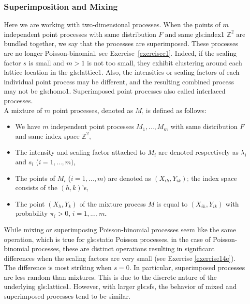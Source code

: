 \documentclass[10pt]{article}
\begin{document}
\subsubsection{Superimposition and Mixing}\label{sm1}

Here we are working with two-dimensional processes. When the points of $m$ independent point processes with same distribution $F$
and same \gls{gls:index1} $\mathbb{Z}^2$ are bundled together, we say that the processes are \textcolor{index}{superimposed}. These processes are no longer Poisson-binomial, see
Exercise~\ref{exercisec1}. Indeed, if the scaling factor $s$ is small and $m>1$ is not too small, they exhibit clustering around each lattice location in the \gls{gls:lattice1}. Also, the intensities or scaling factors of each individual point process may be different, and the resulting combined process may not be \gls{gls:homo1}.
Superimposed point processes also called \textcolor{index}{interlaced} processes. \vspace{1ex} \\
A \textcolor{index}{mixture} of $m$ point processes, denoted as $M$, is defined as follows:
\begin{itemize}
\item We have $m$ independent point processes $M_1,\dots,M_m$ with same distribution $F$ and same index space $\mathbb{Z}^2$,
\item The intensity and scaling factor attached to $M_i$ are denoted respectively as $\lambda_i$ and $s_i$ ($i=1,\dots,m)$,
\item The points of $M_i$ ($i=1,\dots,m)$ are denoted as $(X_{ih},Y_{ik})$; the index space consists of the $(h,k)$'s,
\item The point $(X_h,Y_k)$ of the mixture process $M$ is equal to $(X_{ih},Y_{ik})$ with probability $\pi_i > 0$, $i=1,\dots,m$.
\end{itemize}

\noindent While mixing or superimposing Poisson-binomial processes seem like the same operation, which is true for \gls{gls:statio} Poisson processes, in the case of
Poisson-binomial processes, these are distinct operations resulting in significant differences  when the scaling factors are very small (see Exercise \ref{exercise14e}). The difference
is most striking when $s=0$. In particular,
superimposed processes are less random than mixtures. This is due to the discrete nature of the underlying
\gls{gls:lattice1}. However, with larger \glspl{gls:sf}, the behavior of mixed and superimposed processes tend to be similar.
\end{document}
